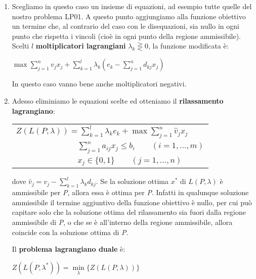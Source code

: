 \documentclass[11pt]{book}
\begin{document}
\begin{enumerate}
  
\item Scegliamo in questo caso un insieme di equazioni, ad esempio
  tutte quelle del nostro problema LP01. A questo punto aggiungiamo
  alla funzione obiettivo un termine che, al contrario del caso con le
  disequazioni, sia nullo in ogni punto che rispetta i vincoli (cio\`e
  in ogni punto della regione ammissibile). Scelti $l$ {\bf
    moltiplicatori lagrangiani} $\lambda_k \gtreqless 0$, la funzione
  modificata \`e:

  \begin{center}
    $\max \sum\limits_{j=1}^n v_jx_j + \sum\limits_{k=1}^l \lambda_k
    (e_k - \sum\limits_{j=1}^n d_{kj}x_j)$
  \end{center}

  In questo caso vanno bene anche moltiplicatori negativi.

\item Adesso eliminiamo le equazioni scelte ed otteniamo il {\bf
  rilassamento lagrangiano}:

  \vspace{11pt}
  \begin{center}
    \begin{tabular}{l}
      $Z(L(P,\lambda)) = \sum\limits_{k=1}^l \lambda_ke_k + \max \sum
      \limits_{j=1}^n \hat{v}_j x_j$\\

      $\phantom{Z(Spi)) = max} \sum\limits_{j=1}^n a_{ij}x_j \leq
      b_i \qquad (i=1,\dots,m)$\\ 
      $\phantom{Z(Spi)) = max} x_j \in \{0,1\} \qquad (j=1,\dots,n)$\\
    \end{tabular}
  \end{center}
  \vspace{11pt}    

  dove $\hat{v}_j = v_j - \sum\limits_{k=1}^l \lambda_k d_{kj}$. Se la
  soluzione ottima $x^*$ di $L(P,\lambda)$ \`e ammissibile per {\em
    P}, allora essa \`e ottima per {\em P}. Infatti in qualunque
  soluzione ammissibile il termine aggiuntivo della funzione obiettivo
  \`e nullo, per cui pu\`o capitare solo che la soluzione ottima del
  rilassamento sia fuori dalla regione ammissibile di {\em P}, o che
  se \`e all'interno della regione ammissibile, allora coincide con la
  soluzione ottima di {\em P}. 

  Il {\bf problema lagrangiano duale} \`e:

  \begin{center}
  $Z(L(P, \lambda^*)) = \min\limits_\lambda \{ Z(L(P, \lambda))\}$
  \end{center}


\end{enumerate}
\end{document}
